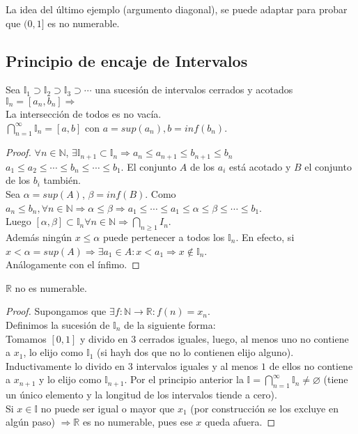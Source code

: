 La idea del último ejemplo (argumento diagonal), se puede adaptar para probar que $(0, 1]$ es no numerable.

\subsection{Principio de encaje de Intervalos}

\begin{theorem}
    Sea $\mathbb{I}_1 \supset \mathbb{I}_2 \supset \mathbb{I}_3 \supset \cdots $ una sucesión de intervalos cerrados y acotados $\mathbb{I}_n = [a_n, b_n] \Rightarrow$ \\
    La intersección de todos es no vacía. \\
    $\bigcap_{n=1}^{\infty} \mathbb{I}_n = [a,b]$ con $a = sup(a_n), b=inf(b_n)$.
    \begin{proof}
        $\forall n \in \mathbb{N}$, $\exists \mathbb{I}_{n+1} \subset \mathbb{I}_n \Rightarrow a_n \leq a_{n+1} \leq b_{n+1} \leq b_n$ \\
        $a_1 \leq a_2 \leq \cdots \leq b_n \leq \cdots \leq b_1$. El conjunto $A$ de los $a_i$ está acotado y $B$ el conjunto de los $b_i$ también. \\
        Sea $\alpha = sup(A)$, $\beta = inf(B)$. Como $a_n \leq b_n, \forall n \in \mathbb{N} \Rightarrow \alpha \leq \beta \Rightarrow a_1 \leq \cdots \leq a_1 \leq \alpha \leq \beta \leq \cdots \leq b_1$. \\
        Luego $[\alpha, \beta] \subset \mathbb{I}_n \forall n \in \mathbb{N} \Rightarrow \bigcap_{n\geq1} I_n$. \\
        Además ningún $x \leq \alpha$ puede pertenecer a todos los $\mathbb{I}_n$. En efecto, si $x < \alpha = sup(A) \Rightarrow \exists a_1\in A: x<a_1 \Rightarrow x\notin \mathbb{I}_n$. \\
        Análogamente con el ínfimo.
    \end{proof}
\end{theorem}

\begin{theorem}
    $\mathbb{R}$  no es numerable.
    \begin{proof}
        Supongamos que $\exists f:\mathbb{N} \to \mathbb{R} : f(n) = x_n$. \\
        Definimos la sucesión de $\mathbb{I}_n$ de la siguiente forma: \\
        Tomamos $[0, 1]$ y divido en $3$ cerrados iguales, luego, al menos uno no contiene a $x_1$, lo elijo como $\mathbb{I}_1$ (si hayh dos que no lo contienen elijo alguno). Inductivamente lo divido en $3$ intervalos iguales y al menos $1$ de ellos no contiene a $x_{n+1}$ y lo elijo como $\mathbb{I}_{n+1}$. Por el principio anterior la $\mathbb{I} = \bigcap_{n=1}^\infty \mathbb{I}_n \neq \varnothing$ (tiene un único elemento y la longitud de los intervalos tiende a cero). \\
        Si $x \in \mathbb{I}$ no puede ser igual o mayor que $x_1$ (por construcción se los excluye en algún paso) $\Rightarrow \mathbb{R}$ es no numerable, pues ese $x$ queda afuera.
    \end{proof}
\end{theorem}

